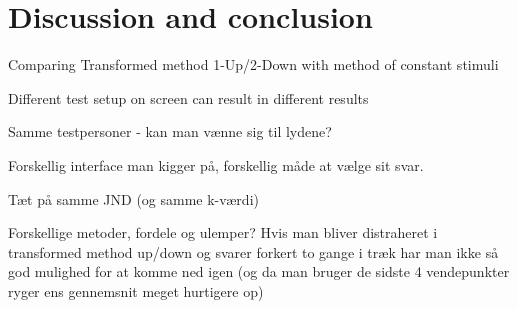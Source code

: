 \section*{Discussion and conclusion}
Comparing Transformed method 1-Up/2-Down with method of constant stimuli


Different test setup on screen can result in different results

Samme testpersoner - kan man vænne sig til lydene?

Forskellig interface man kigger på, forskellig måde at vælge sit svar. 

Tæt på samme JND (og samme k-værdi)

Forskellige metoder, fordele og ulemper? Hvis man bliver distraheret i transformed method up/down og svarer forkert to gange i træk har man ikke så god mulighed for at komme ned igen (og da man bruger de sidste 4 vendepunkter ryger ens gennemsnit meget hurtigere op)

